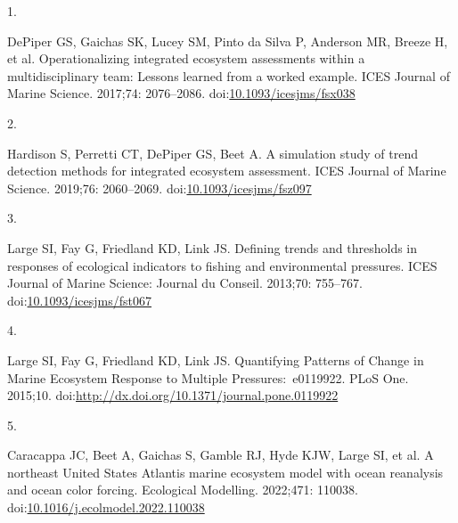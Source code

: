 \documentclass[
  10pt,
]{article}
\newlength{\cslhangindent}
\newlength{\csllabelwidth}
\newenvironment{CSLReferences}[2] %
 {\begin{list}{}{%
  \setlength{\itemindent}{0pt}
  \setlength{\leftmargin}{0pt}
  \setlength{\parsep}{0pt}
  \ifodd #1
   \setlength{\leftmargin}{\cslhangindent}
   \setlength{\itemindent}{-1\cslhangindent}
  \fi
  \setlength{\itemsep}{#2\baselineskip}}}
 {\end{list}}
\newcommand{\CSLLeftMargin}[1]{\parbox[t]{\csllabelwidth}{\strut#1\strut}}
\newcommand{\CSLRightInline}[1]{\parbox[t]{\linewidth - \csllabelwidth}{\strut#1\strut}}
\begin{document}
\label{refs}
\begin{CSLReferences}{0}{1}
\CSLLeftMargin{1. }%
\CSLRightInline{DePiper GS, Gaichas SK, Lucey SM, Pinto da Silva P,
Anderson MR, Breeze H, et al. Operationalizing integrated ecosystem
assessments within a multidisciplinary team: Lessons learned from a
worked example. ICES Journal of Marine Science. 2017;74: 2076--2086.
doi:\href{https://doi.org/10.1093/icesjms/fsx038}{10.1093/icesjms/fsx038}}

\CSLLeftMargin{2. }%
\CSLRightInline{Hardison S, Perretti CT, DePiper GS, Beet A. A
simulation study of trend detection methods for integrated ecosystem
assessment. ICES Journal of Marine Science. 2019;76: 2060--2069.
doi:\href{https://doi.org/10.1093/icesjms/fsz097}{10.1093/icesjms/fsz097}}

\CSLLeftMargin{3. }%
\CSLRightInline{Large SI, Fay G, Friedland KD, Link JS. Defining trends
and thresholds in responses of ecological indicators to fishing and
environmental pressures. ICES Journal of Marine Science: Journal du
Conseil. 2013;70: 755--767.
doi:\href{https://doi.org/10.1093/icesjms/fst067}{10.1093/icesjms/fst067}}

\CSLLeftMargin{4. }%
\CSLRightInline{Large SI, Fay G, Friedland KD, Link JS. Quantifying
{Patterns} of {Change} in {Marine} {Ecosystem} {Response} to {Multiple}
{Pressures}:~e0119922. PLoS One. 2015;10.
doi:\url{http://dx.doi.org/10.1371/journal.pone.0119922}}

\CSLLeftMargin{5. }%
\CSLRightInline{Caracappa JC, Beet A, Gaichas S, Gamble RJ, Hyde KJW,
Large SI, et al. A northeast {United} {States} {Atlantis} marine
ecosystem model with ocean reanalysis and ocean color forcing.
Ecological Modelling. 2022;471: 110038.
doi:\href{https://doi.org/10.1016/j.ecolmodel.2022.110038}{10.1016/j.ecolmodel.2022.110038}}

\end{CSLReferences}
\end{document}

